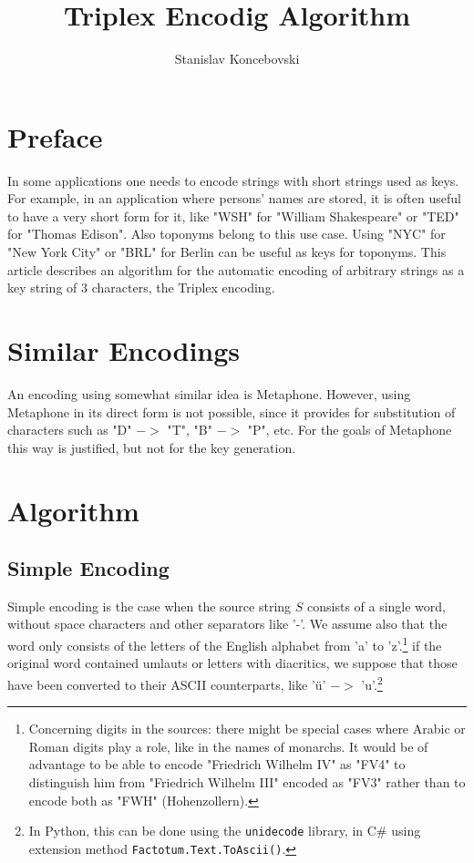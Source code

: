 \documentclass[12pt,a4paper]{article}
\author{Stanislav Koncebovski}
\title{Triplex Encodig Algorithm}
\begin{document}
	\maketitle
	
\section{Preface}
In some applications one needs to encode strings with short strings used as keys. For example, in an application where persons' names are stored, it is often useful to have a very short form for it, like "WSH" for "William Shakespeare" or "TED" for "Thomas Edison". Also toponyms belong to this use case. Using "NYC" for "New York City" or "BRL" for Berlin can be useful as keys for toponyms. This article describes an algorithm for the automatic encoding of arbitrary strings as a key string of 3 characters, the Triplex encoding.

\section{Similar Encodings}
An encoding using somewhat similar idea is Metaphone\cite{10.5555/349124.349132}. However, using Metaphone in its direct form is not possible, since it provides for substitution of characters such as "D" $->$ "T", "B" $->$ "P", etc. For the goals of Metaphone this way is justified, but not for the key generation.
	
\section{Algorithm}

	\subsection{Simple Encoding}
	Simple encoding is the case when the source string $S$ consists of a single word, without space characters and other separators like '-'. We assume also that the word only consists of the letters of the English alphabet from 'a' to 'z'.\footnote{Concerning digits in the sources: there might be special cases where Arabic or Roman digits play a role, like in the names of monarchs. It would be of advantage to be able to encode "Friedrich Wilhelm IV" as "FV4" to distinguish him from "Friedrich Wilhelm III" encoded as "FV3" rather than to encode both as "FWH" (Hohenzollern).} if the original word contained umlauts or letters with diacritics, we suppose that those have been converted to their ASCII counterparts, like 'ü' $->$ 'u'.\footnote{In Python, this can be done using the \texttt{unidecode} library, in C\# using extension method \texttt{Factotum.Text.ToAscii()}.}
	
\end{document}
